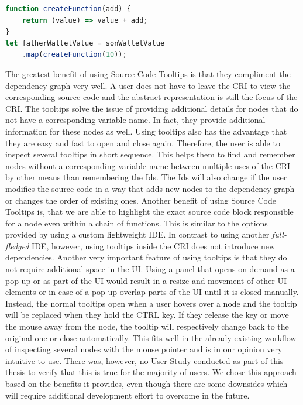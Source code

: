 \begin{lstlisting}[language=JavaScript, caption={Example of using a creation function in RxJS.},label={lst:NonLambdaCallback}]
function createFunction(add) {
	return (value) => value + add;
}
let fatherWalletValue = sonWalletValue
	.map(createFunction(10));
\end{lstlisting}
The greatest benefit of using Source Code Tooltips is that they compliment the dependency graph very well. A user does not have to leave the CRI to view the corresponding source code and the abstract representation is still the focus of the CRI. The tooltips solve the issue of providing additional details for nodes that do not have a corresponding variable name. In fact, they provide additional information for these nodes as well. Using tooltips also has the advantage that they are easy and fast to open and close again. Therefore, the user is able to inspect several tooltips in short sequence. This helps them to find and remember nodes without a corresponding variable name between multiple uses of the CRI by other means than remembering the Ids. The Ids will also change if the user modifies the source code in a way that adds new nodes to the dependency graph or changes the order of existing ones. Another benefit of using Source Code Tooltips is, that we are able to highlight the exact source code block responsible for a node even within a chain of functions. This is similar to the options provided by using a custom lightweight IDE. In contrast to using another \emph{full-fledged} IDE, however, using tooltips inside the CRI does not introduce new dependencies. Another very important feature of using tooltips is that they do not require additional space in the UI. Using a panel that opens on demand as a pop-up or as part of the UI would result in a resize and movement of other UI elements or in case of a pop-up overlap parts of the UI until it is closed manually. Instead, the normal tooltips open when a user hovers over a node and the tooltip will be replaced when they hold the CTRL key. If they release the key or move the mouse away from the node, the tooltip will respectively change back to the original one or close automatically. This fits well in the already existing workflow of inspecting several nodes with the mouse pointer and is in our opinion very intuitive to use. There was, however, no User Study conducted as part of this thesis to verify that this is true for the majority of users. We chose this approach based on the benefits it provides, even though there are some downsides which will require additional development effort to overcome in the future.
			
